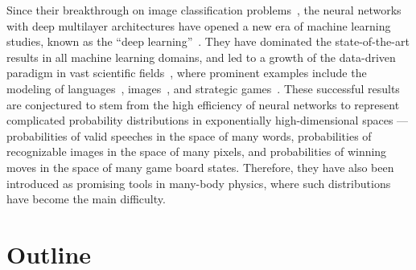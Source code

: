 Since their breakthrough on image classification problems~\cite{krizhevsky2012imagenet}, the neural networks with deep multilayer architectures have opened a new era of machine learning studies, known as the ``deep learning''~\cite{goodfellow2016deep}. They have dominated the state-of-the-art results in all machine learning domains, and led to a growth of the data-driven paradigm in vast scientific fields~\cite{montans2019data}, where prominent examples include the modeling of languages~\cite{brown2020language}, images~\cite{rombach2022high}, and strategic games~\cite{silver2016mastering}. These successful results are conjectured to stem from the high efficiency of neural networks to represent complicated probability distributions in exponentially high-dimensional spaces --- probabilities of valid speeches in the space of many words, probabilities of recognizable images in the space of many pixels, and probabilities of winning moves in the space of many game board states. Therefore, they have also been introduced as promising tools in many-body physics, where such distributions have become the main difficulty.

\section{Outline}


